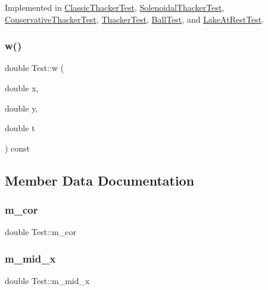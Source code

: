 Implemented in \hyperlink{classClassicThackerTest_a7dcad970cbd5afaec513109e701075e8}{Classic\+Thacker\+Test}, \hyperlink{classSolenoidalThackerTest_a87487f308128e5ca961481dd75da6abf}{Solenoidal\+Thacker\+Test}, \hyperlink{classConservativeThackerTest_ada42cdb161739dc9b831eac7af8312a3}{Conservative\+Thacker\+Test}, \hyperlink{classThackerTest_a445339d59012efde1e6d27ab060b6781}{Thacker\+Test}, \hyperlink{classBallTest_a37f7bbe3960912d5284acf91eea382b6}{Ball\+Test}, and \hyperlink{classLakeAtRestTest_a28e6c95e19a7419e53a09e1b32082419}{Lake\+At\+Rest\+Test}.

\mbox{\label{classTest_ab61819f5c55c179a658189ea22f0e15c}} 
\subsubsection{\texorpdfstring{w()}{w()}}
{\footnotesize\ttfamily double Test\+::w (\begin{DoxyParamCaption}\item[{double}]{x,  }\item[{double}]{y,  }\item[{double}]{t }\end{DoxyParamCaption}) const\hspace{0.3cm}{\ttfamily [inline]}}



\subsection{Member Data Documentation}
\mbox{\label{classTest_a11d3ba96c9d5a13c3fb556fa7572b763}} 
\subsubsection{\texorpdfstring{m\+\_\+cor}{m\_cor}}
{\footnotesize\ttfamily double Test\+::m\+\_\+cor\hspace{0.3cm}{\ttfamily [protected]}}

\mbox{\label{classTest_aa0140a23f98929962123d85af64344e8}} 
\subsubsection{\texorpdfstring{m\+\_\+mid\+\_\+x}{m\_mid\_x}}
{\footnotesize\ttfamily double Test\+::m\+\_\+mid\+\_\+x\hspace{0.3cm}{\ttfamily [protected]}}

